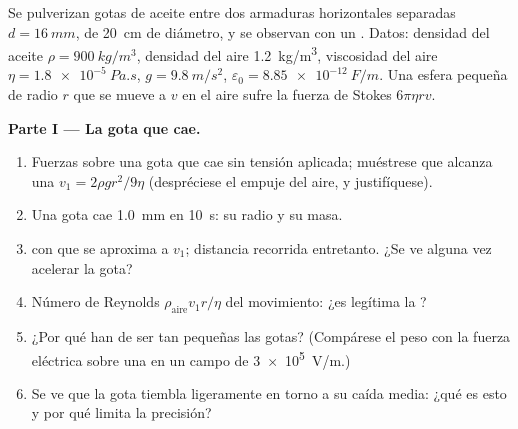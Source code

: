 \begin{problem}
\label{pb:b1:potential-capacitors:1}
Se pulverizan gotas de aceite entre dos armaduras horizontales separadas
$d = \qty{16}{mm}$, de \qty{20}{cm} de diámetro, y se observan con un
. Datos: densidad del aceite $\rho = \qty{900}{kg/m^3}$,
densidad del aire \qty{1.2}{kg/m^3}, viscosidad del aire $\eta = \qty{1.8e-5}{Pa.s}$, $g =
\qty{9.8}{m/s^2}$, $\varepsilon_0 = \qty{8.85e-12}{F/m}$. Una esfera pequeña de
radio $r$ que se mueve a $v$ en el aire sufre la fuerza de Stokes $6\pi\eta rv$.

\medskip
\noindent\textbf{Parte I --- La gota que cae.}
\begin{enumerate}
  \item Fuerzas sobre una gota que cae sin tensión aplicada; muéstrese que
        alcanza una  $v_1 = 2\rho gr^2/9\eta$ (despréciese
        el empuje del aire, y justifíquese).
  \item Una gota cae \qty{1.0}{mm} en \qty{10}{s}: su radio y su masa.
  \item {} con que se aproxima a $v_1$; distancia
        recorrida entretanto. ¿Se ve alguna vez acelerar la gota?
  \item Número de Reynolds $\rho_{\text{aire}}v_1r/\eta$ del movimiento:
        ¿es legítima la ?
  \item ¿Por qué han de ser tan pequeñas las gotas? (Compárese el peso con
        la fuerza eléctrica sobre una  en un campo de
        \qty{3e5}{V/m}.)
  \item Se ve que la gota tiembla ligeramente en torno a su caída media:
        ¿qué es esto y por qué limita la precisión?
\end{enumerate}


\end{problem}
